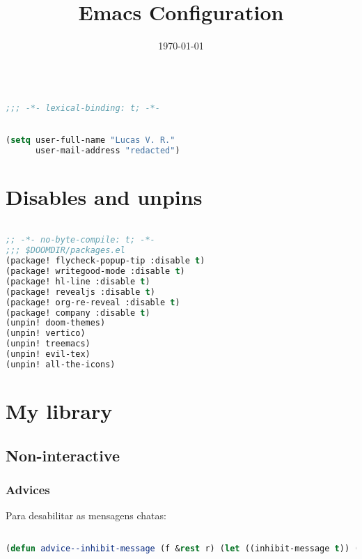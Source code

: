 \documentclass[11pt]{article}
\date{\today}
\title{Emacs Configuration}
\begin{document}
\maketitle

\begin{lstlisting}[language=Lisp]%! Someone please complete this list for me

;;; -*- lexical-binding: t; -*-
\end{lstlisting}

\begin{lstlisting}[language=Lisp]%! Someone please complete this list for me

(setq user-full-name "Lucas V. R."
      user-mail-address "redacted")
\end{lstlisting}
\section{Disables and unpins}
\label{sec:disables-and-unpins}
\begin{lstlisting}[language=Lisp]%! Someone please complete this list for me

;; -*- no-byte-compile: t; -*-
;;; $DOOMDIR/packages.el
(package! flycheck-popup-tip :disable t)
(package! writegood-mode :disable t)
(package! hl-line :disable t)
(package! revealjs :disable t)
(package! org-re-reveal :disable t)
(package! company :disable t)
(unpin! doom-themes)
(unpin! vertico)
(unpin! treemacs)
(unpin! evil-tex)
(unpin! all-the-icons)
\end{lstlisting}

\section{My library}
\label{sec:my-library}


\subsection{Non-interactive}
\label{sec:non-interactive}


\subsubsection{Advices}
\label{sec:advices}
Para desabilitar as mensagens chatas:

\begin{lstlisting}[language=Lisp]%! Someone please complete this list for me

(defun advice--inhibit-message (f &rest r) (let ((inhibit-message t)) (apply f r)))
\end{lstlisting}
\end{document}
